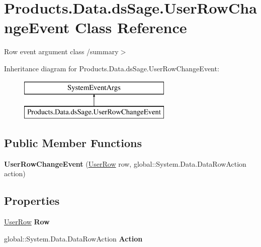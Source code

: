 \hypertarget{class_products_1_1_data_1_1ds_sage_1_1_user_row_change_event}{}\section{Products.\+Data.\+ds\+Sage.\+User\+Row\+Change\+Event Class Reference}
\label{class_products_1_1_data_1_1ds_sage_1_1_user_row_change_event}


Row event argument class /summary$>$  


Inheritance diagram for Products.\+Data.\+ds\+Sage.\+User\+Row\+Change\+Event\+:\begin{figure}[H]
\begin{center}
\leavevmode
\includegraphics[height=2.000000cm]{class_products_1_1_data_1_1ds_sage_1_1_user_row_change_event}
\end{center}
\end{figure}
\subsection*{Public Member Functions}
\begin{DoxyCompactItemize}
\item 
{\bfseries User\+Row\+Change\+Event} (\hyperlink{class_products_1_1_data_1_1ds_sage_1_1_user_row}{User\+Row} row, global\+::\+System.\+Data.\+Data\+Row\+Action action)\hypertarget{class_products_1_1_data_1_1ds_sage_1_1_user_row_change_event_a4ce6ba2f0d93a8bad07d15537a4fe2f4}{}\label{class_products_1_1_data_1_1ds_sage_1_1_user_row_change_event_a4ce6ba2f0d93a8bad07d15537a4fe2f4}

\end{DoxyCompactItemize}
\subsection*{Properties}
\begin{DoxyCompactItemize}
\item 
\hyperlink{class_products_1_1_data_1_1ds_sage_1_1_user_row}{User\+Row} {\bfseries Row}\hypertarget{class_products_1_1_data_1_1ds_sage_1_1_user_row_change_event_a845aec939f48510a5ddf02e28d679d22}{}\label{class_products_1_1_data_1_1ds_sage_1_1_user_row_change_event_a845aec939f48510a5ddf02e28d679d22}

\item 
global\+::\+System.\+Data.\+Data\+Row\+Action {\bfseries Action}\hypertarget{class_products_1_1_data_1_1ds_sage_1_1_user_row_change_event_a9e4247a1ac968dc1dd408f06be9635b1}{}\label{class_products_1_1_data_1_1ds_sage_1_1_user_row_change_event_a9e4247a1ac968dc1dd408f06be9635b1}

\end{DoxyCompactItemize}


